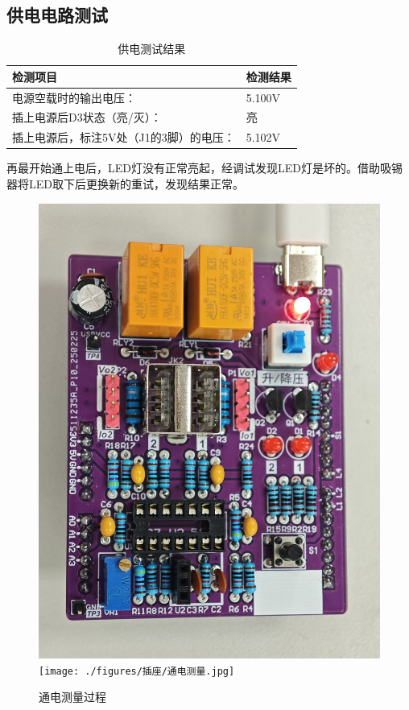\subsection{供电电路测试}
\begin{table}[H]
\centering
\caption{供电测试结果}
\begin{tabular}{L{.7\textwidth}C{.2\textwidth}}
\toprule
检测项目 & 检测结果\\
\midrule
电源空载时的输出电压：  & 5.100V \\
插上电源后D3状态（亮/灭）：     & 亮    \\
插上电源后，标注5V处（J1的3脚）的电压： & 5.102V\\
\bottomrule
\end{tabular}
\end{table}
再最开始通上电后，LED灯没有正常亮起，经调试发现LED灯是坏的。借助吸锡器将LED取下后更换新的重试，发现结果正常。
\begin{figure}[H]
\centering
\includegraphics[width=.3\textwidth]{./figures/插座/通电.jpg}
\texttt{[image: ./figures/插座/通电测量.jpg]}
\caption{通电测量过程}
\end{figure}
